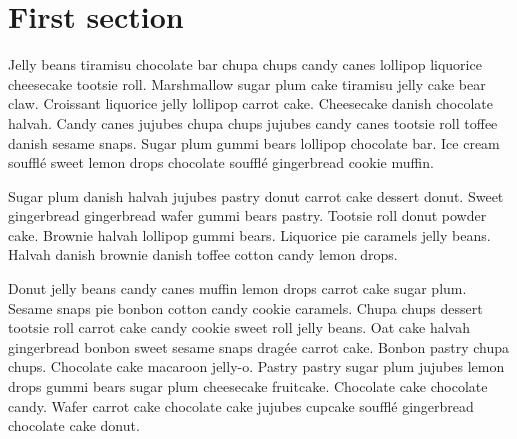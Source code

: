\section{First section}
Jelly beans tiramisu chocolate bar chupa chups candy canes lollipop liquorice 
cheesecake tootsie roll. Marshmallow sugar plum cake tiramisu jelly cake bear 
claw. Croissant liquorice jelly lollipop carrot cake. Cheesecake danish 
chocolate halvah. Candy canes jujubes chupa chups jujubes candy canes tootsie 
roll toffee danish sesame snaps. Sugar plum gummi bears lollipop chocolate bar. 
Ice cream soufflé sweet lemon drops chocolate soufflé gingerbread cookie muffin.

Sugar plum danish halvah jujubes pastry donut carrot cake dessert donut. Sweet 
gingerbread gingerbread wafer gummi bears pastry. Tootsie roll donut powder 
cake. Brownie halvah lollipop gummi bears. Liquorice pie caramels jelly beans. 
Halvah danish brownie danish toffee cotton candy lemon drops.

Donut jelly beans candy canes muffin lemon drops carrot cake sugar plum. Sesame 
snaps pie bonbon cotton candy cookie caramels. Chupa chups dessert tootsie roll 
carrot cake candy cookie sweet roll jelly beans. Oat cake halvah gingerbread 
bonbon sweet sesame snaps dragée carrot cake. Bonbon pastry chupa chups. 
Chocolate cake macaroon jelly-o. Pastry pastry sugar plum jujubes lemon drops 
gummi bears sugar plum cheesecake fruitcake. Chocolate cake chocolate candy. 
Wafer carrot cake chocolate cake jujubes cupcake soufflé gingerbread chocolate 
cake donut.
